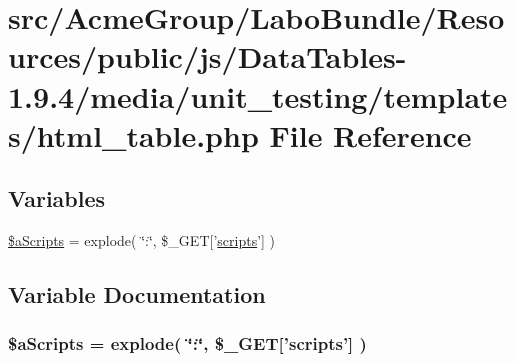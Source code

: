 \hypertarget{html__table_8php}{\section{src/\+Acme\+Group/\+Labo\+Bundle/\+Resources/public/js/\+Data\+Tables-\/1.9.4/media/unit\+\_\+testing/templates/html\+\_\+table.php File Reference}
\label{html__table_8php}
}
\subsection*{Variables}
\begin{DoxyCompactItemize}
\item 
\hyperlink{html__table_8php_a3e8e1608000c9afdd05327fc2b06b056}{\$a\+Scripts} = explode( \char`\"{}\+:\char`\"{}, \$\+\_\+\+G\+E\+T\mbox{[}'\hyperlink{tinymce_8jquery_8dev_8js_a09066d4d580eeec222f858d588b4cdef}{scripts}'\mbox{]} )
\end{DoxyCompactItemize}


\subsection{Variable Documentation}
\hypertarget{html__table_8php_a3e8e1608000c9afdd05327fc2b06b056}{
\subsubsection[{\$a\+Scripts}]{\setlength{\rightskip}{0pt plus 5cm}\$a\+Scripts = explode( \char`\"{}\+:\char`\"{}, \$\+\_\+\+G\+E\+T\mbox{[}'{\bf scripts}'\mbox{]} )}}\label{html__table_8php_a3e8e1608000c9afdd05327fc2b06b056}
